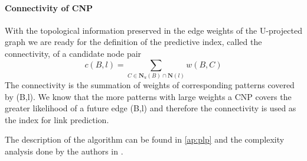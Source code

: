 \paragraph{Connectivity of CNP}
With the topological information preserved in the edge weights of the U-projected graph we are ready for the definition of the predictive index, called the connectivity, of a candidate node pair
$$
 c(B,l) = \sum_{C\in\textbf{N}_u(B) \cap \textbf{N}(l) } w(B,C)
$$
The connectivity is the summation of weights of corresponding patterns covered by (B,l). We know that the more patterns with large weights a CNP covers the greater likelihood of a future edge (B,l) and therefore the connectivity is used as the index for link prediction.

The description of the algorithm can be found in \ref{ap:plp} and the complexity analysis done by the authors in \cite{plp}.
